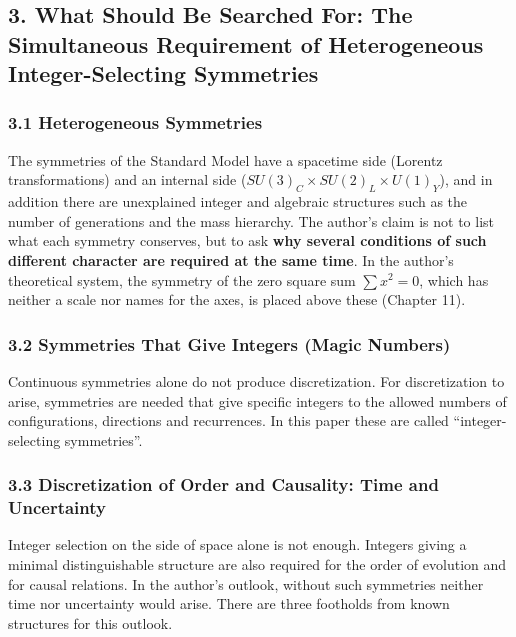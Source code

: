 \documentclass[
  a4paper,
]{article}
\begin{document}
\subsection{3. What Should Be Searched For: The Simultaneous Requirement
of Heterogeneous Integer-Selecting
Symmetries}\label{what-should-be-searched-for-the-simultaneous-requirement-of-heterogeneous-integer-selecting-symmetries}

\subsubsection{3.1 Heterogeneous
Symmetries}\label{heterogeneous-symmetries}

The symmetries of the Standard Model have a spacetime side (Lorentz
transformations) and an internal side
(\(SU(3)_C\times SU(2)_L\times U(1)_Y\)), and in addition there are
unexplained integer and algebraic structures such as the number of
generations and the mass hierarchy. The author's claim is not to list
what each symmetry conserves, but to ask \textbf{why several conditions
of such different character are required at the same time}. In the
author's theoretical system, the symmetry of the zero square sum
\(\sum x^2=0\), which has neither a scale nor names for the axes, is
placed above these (Chapter 11).

\subsubsection{3.2 Symmetries That Give Integers (Magic
Numbers)}\label{symmetries-that-give-integers-magic-numbers}

Continuous symmetries alone do not produce discretization. For
discretization to arise, symmetries are needed that give specific
integers to the allowed numbers of configurations, directions and
recurrences. In this paper these are called ``integer-selecting
symmetries''.

\subsubsection{3.3 Discretization of Order and Causality: Time and
Uncertainty}\label{discretization-of-order-and-causality-time-and-uncertainty}

Integer selection on the side of space alone is not enough. Integers
giving a minimal distinguishable structure are also required for the
order of evolution and for causal relations. In the author's outlook,
without such symmetries neither time nor uncertainty would arise. There
are three footholds from known structures for this outlook.
\end{document}
